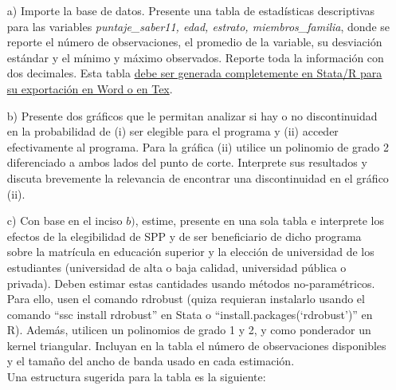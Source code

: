 \documentclass[a4paper]{article}
\begin{document}
\begin{itemize}
    \item[a)] Importe la base de datos. Presente una tabla de estadísticas descriptivas para las variables \emph{puntaje\_saber11, edad, estrato, miembros\_familia}, donde se reporte el número de observaciones, el promedio de la variable, su desviación estándar y el mínimo y máximo observados. Reporte toda la información con dos decimales. Esta tabla \underline{debe ser generada completemente en Stata/R para su exportación en Word o en Tex}.\\
    
       \item[b)] Presente dos gráficos que le permitan analizar si hay o no discontinuidad en la probabilidad
de (i) ser elegible para el programa y (ii) acceder efectivamente al programa. Para la gráfica
(ii) utilice un polinomio de grado 2 diferenciado a ambos lados del punto de corte. Interprete
sus resultados y discuta brevemente la relevancia de encontrar una discontinuidad en el
gráfico (ii).\\

\item[c)] Con base en el inciso $b)$, estime, presente en una sola tabla e interprete los efectos de la elegibilidad de SPP y de ser beneficiario de dicho programa sobre la
matrícula en educación superior y la elección de universidad de los estudiantes (universidad
de alta o baja calidad, universidad pública o privada). Deben estimar estas cantidades usando métodos no-paramétricos. Para ello, usen el comando
rdrobust (quiza requieran instalarlo usando el comando ``ssc install rdrobust'' en Stata o ``install.packages(‘rdrobust’)'' en R). Además, utilicen un polinomios de grado 1 y 2, y como ponderador un kernel triangular. Incluyan en la tabla el número de observaciones disponibles y el tamaño del ancho de banda usado en cada estimación.\\

Una estructura sugerida para la tabla es la siguiente:


\end{itemize}
\end{document}
